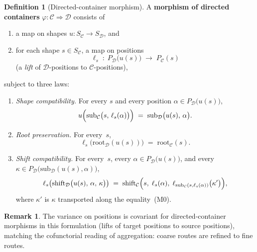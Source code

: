 \documentclass[11pt,a4paper]{article}
\theoremstyle{plain}
\theoremstyle{definition}
\newtheorem{definition}[theorem]{Definition}
\newtheorem{remark}[theorem]{Remark}
\newcommand{\rootpos}{\mathrm{root}}
\newcommand{\sub}{\mathrm{sub}}
\newcommand{\shift}{\mathrm{shift}}
\begin{document}
\begin{definition}[Directed-container morphism]\label{def:dc-morphism}
A \textbf{morphism of directed containers}
$\varphi : \mathcal{C} \Rightarrow \mathcal{D}$ consists of
\begin{enumerate}
  \item a map on shapes $u : S_{\mathcal{C}} \to S_{\mathcal{D}}$, and
  \item for each shape $s \in S_{\mathcal{C}}$, a map on positions
        \[
          \ell_s \;:\;
          P_{\mathcal{D}}\bigl(u(s)\bigr)
          \;\longrightarrow\;
          P_{\mathcal{C}}(s)
        \]
        (a \emph{lift} of $\mathcal{D}$-positions to $\mathcal{C}$-positions),
\end{enumerate}
subject to three laws:
\begin{enumerate}
  \item[\textbf{(M0)}] \emph{Shape compatibility.} For every $s$ and every
        position $\alpha \in P_{\mathcal{D}}\bigl(u(s)\bigr)$,
        \[
          u\Bigl(\sub_{\mathcal{C}}\bigl(s,\, \ell_s(\alpha)\bigr)\Bigr)
          \;=\;
          \sub_{\mathcal{D}}\bigl(u(s),\, \alpha\bigr).
        \]
  \item[\textbf{(M1)}] \emph{Root preservation.} For every~$s$,
        \[
          \ell_s\bigl(\rootpos_{\mathcal{D}}(u(s))\bigr)
          \;=\;
          \rootpos_{\mathcal{C}}(s).
        \]
  \item[\textbf{(M2)}] \emph{Shift compatibility.} For every~$s$, every
        $\alpha \in P_{\mathcal{D}}\bigl(u(s)\bigr)$, and every
        $\kappa \in P_{\mathcal{D}}\bigl(
          \sub_{\mathcal{D}}(u(s),\alpha)\bigr)$,
        \[
          \ell_s\bigl(
            \shift_{\mathcal{D}}\bigl(u(s),\, \alpha,\, \kappa\bigr)
          \bigr)
          \;=\;
          \shift_{\mathcal{C}}\Bigl(
            s,\;
            \ell_s(\alpha),\;
            \ell_{\sub_{\mathcal{C}}(s,\ell_s(\alpha))}
              \bigl(\kappa'\bigr)
          \Bigr),
        \]
        where $\kappa'$ is $\kappa$ transported along the equality~(M0).
\end{enumerate}
\end{definition}

\begin{remark}
The variance on positions is covariant for directed-container morphisms in this
formulation (lifts of target positions to source positions), matching the
cofunctorial reading of aggregation: coarse routes are refined to fine routes.
\end{remark}
\end{document}
